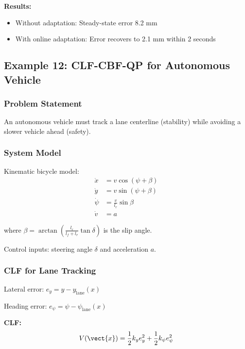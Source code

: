 \textbf{Results:}
\begin{itemize}
    \item Without adaptation: Steady-state error 8.2 mm
    \item With online adaptation: Error recovers to 2.1 mm within 2 seconds
\end{itemize}

\subsection{Example 12: CLF-CBF-QP for Autonomous Vehicle}
\label{ex:clf_cbf_vehicle}

\subsubsection{Problem Statement}

An autonomous vehicle must track a lane centerline (stability) while avoiding a slower vehicle ahead (safety).

\subsubsection{System Model}

Kinematic bicycle model:
\begin{align}
\dot{x} &= v\cos(\psi + \beta) \\
\dot{y} &= v\sin(\psi + \beta) \\
\dot{\psi} &= \frac{v}{l_r}\sin\beta \\
\dot{v} &= a
\end{align}

where $\beta = \arctan\left(\frac{l_r}{l_f + l_r}\tan\delta\right)$ is the slip angle.

Control inputs: steering angle $\delta$ and acceleration $a$.

\subsubsection{CLF for Lane Tracking}

Lateral error: $e_y = y - y_{\text{lane}}(x)$

Heading error: $e_\psi = \psi - \psi_{\text{lane}}(x)$

\textbf{CLF:}
\begin{equation}
V(\vect{x}) = \frac{1}{2}k_y e_y^2 + \frac{1}{2}k_\psi e_\psi^2
\end{equation}

